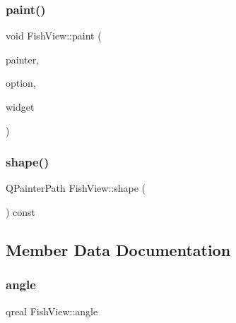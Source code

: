\subsubsection{\texorpdfstring{paint()}{paint()}}
{\footnotesize\ttfamily void Fish\+View\+::paint (\begin{DoxyParamCaption}\item[{Q\+Painter $\ast$}]{painter,  }\item[{const Q\+Style\+Option\+Graphics\+Item $\ast$}]{option,  }\item[{Q\+Widget $\ast$}]{widget }\end{DoxyParamCaption})}

\mbox{\label{classFishView_a84eca7db1edb590324cdb995847c7c14_a84eca7db1edb590324cdb995847c7c14}} 
\subsubsection{\texorpdfstring{shape()}{shape()}}
{\footnotesize\ttfamily Q\+Painter\+Path Fish\+View\+::shape (\begin{DoxyParamCaption}{ }\end{DoxyParamCaption}) const}



\subsection{Member Data Documentation}
\mbox{\label{classFishView_a5ec328c652ae36aef35d13c260dfebc0_a5ec328c652ae36aef35d13c260dfebc0}} 
\subsubsection{\texorpdfstring{angle}{angle}}
{\footnotesize\ttfamily qreal Fish\+View\+::angle\hspace{0.3cm}{\ttfamily [private]}}

\mbox{\label{classFishView_a236ec7d747c4f6165cdeddf4b2fd7e56_a236ec7d747c4f6165cdeddf4b2fd7e56}} 
